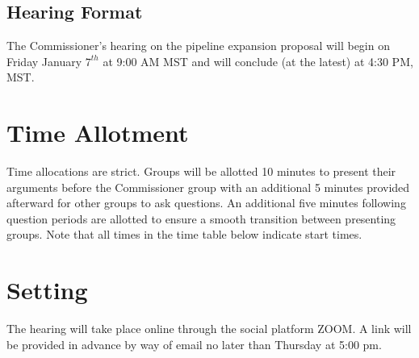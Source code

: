 \documentclass[12pt, letterpaper]{article}
\begin{document}
\begin{center}
  {\section*{\normalfont\normalsize\bf Hearing Format}}
\end{center}

\vspace{12pt}

\noindent The Commissioner's hearing on the pipeline expansion proposal will
begin on Friday January $7^{th}$ at 9:00 AM MST and will conclude (at the latest) at
4:30 PM, MST.

\vspace{12pt}

\section*{\normalfont\normalsize\bf Time Allotment}
\noindent Time allocations are strict. Groups will be allotted 10 minutes to
present their arguments before the Commissioner group with an additional 5
minutes provided afterward for other groups to ask questions. An additional five
minutes following question periods are allotted to ensure a smooth transition
between presenting groups. Note that all times in the time table below indicate
start times.

\section*{\normalfont\normalsize\bf Setting}
\noindent The hearing will take place online through the social platform ZOOM. A
link will be provided in advance by way of email no later than Thursday at 5:00
pm.
\end{document}
